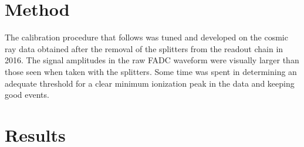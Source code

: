 \documentclass[twoside]{article}
\begin{document}
\section{Method}
The calibration procedure that follows was tuned and developed on the cosmic ray data obtained after the removal of the splitters from the readout chain in 2016. The signal amplitudes in the raw FADC waveform were visually larger than those seen when taken with the splitters. Some time was spent in determining an adequate threshold for a clear minimum ionization peak in the data and keeping good events. 








\section{Results}

\end{document}
